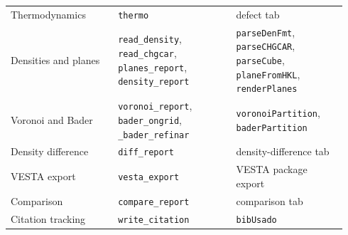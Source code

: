 \documentclass[11pt,a4paper]{article}
\newcommand{\code}[1]{\texttt{#1}}
\begin{document}
\begin{small}
\begin{longtable}{@{}p{0.30\linewidth}p{0.33\linewidth}p{0.31\linewidth}@{}}
Thermodynamics & \code{thermo} & defect tab \\
Densities and planes & \code{read\_density}, \code{read\_chgcar}, \code{planes\_report}, \code{density\_report} & \code{parseDenFmt}, \code{parseCHGCAR}, \code{parseCube}, \code{planeFromHKL}, \code{renderPlanes} \\
Voronoi and Bader & \code{voronoi\_report}, \code{bader\_ongrid}, \code{\_bader\_refinar} & \code{voronoiPartition}, \code{baderPartition} \\
Density difference & \code{diff\_report} & density-difference tab \\
VESTA export & \code{vesta\_export} & VESTA package export \\
Comparison & \code{compare\_report} & comparison tab \\
Citation tracking & \code{write\_citation} & \code{bibUsado} \\\bottomrule
\end{longtable}
\end{small}



\end{document}
